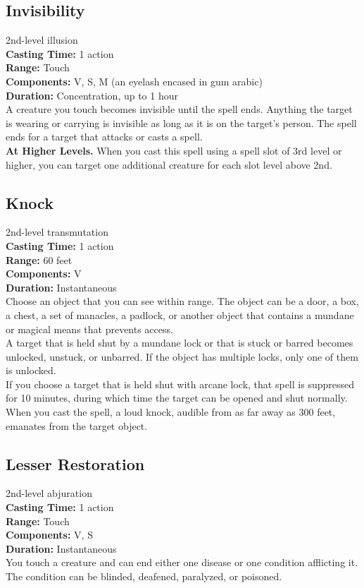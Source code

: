 \documentclass[11pt, A4paper, english]{article}
\begin{document}
		\subsection{Invisibility}
2nd-level illusion \\
\textbf{Casting Time:} 1 action \\
\textbf{Range:} Touch \\
\textbf{Components:} V, S, M (an eyelash encased in gum arabic) \\
\textbf{Duration:} Concentration, up to 1 hour \\
A creature you touch becomes invisible until the spell ends. Anything the target is wearing or carrying is invisible as long as it is on the target’s person. The spell ends for a target that attacks or casts a spell. \\
\textbf{At Higher Levels.} When you cast this spell using a spell slot of 3rd level or higher, you can target one additional creature for each slot level above 2nd.

		\subsection{Knock}
2nd-level transmutation \\
\textbf{Casting Time:} 1 action \\
\textbf{Range:} 60 feet \\
\textbf{Components:} V \\
\textbf{Duration:} Instantaneous \\
Choose an object that you can see within range. The object can be a door, a box, a chest, a set of manacles, a padlock, or another object that contains a mundane or magical means that prevents access. \\
A target that is held shut by a mundane lock or that is stuck or barred becomes unlocked, unstuck, or unbarred. If the object has multiple locks, only one of them is unlocked. \\
If you choose a target that is held shut with arcane lock, that spell is suppressed for 10 minutes, during which time the target can be opened and shut normally. When you cast the spell, a loud knock, audible from as far away as 300 feet, emanates from the target object.

		\subsection{Lesser Restoration}
2nd-level abjuration \\
\textbf{Casting Time:} 1 action \\
\textbf{Range:} Touch \\
\textbf{Components:} V, S \\
\textbf{Duration:} Instantaneous \\
You touch a creature and can end either one disease or one condition afflicting it. The condition can be blinded, deafened, paralyzed, or poisoned.
\end{document}
